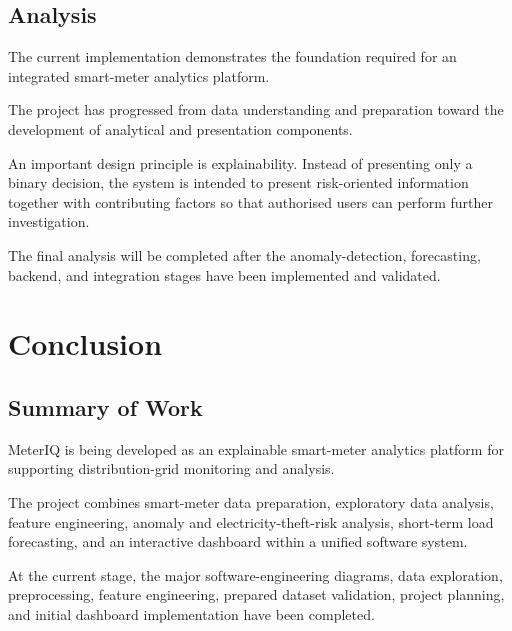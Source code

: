 \documentclass{tietreport}
\begin{document}
\section{Analysis}

The current implementation demonstrates the foundation required for an
integrated smart-meter analytics platform.

The project has progressed from data understanding and preparation toward
the development of analytical and presentation components.

An important design principle is explainability. Instead of presenting only
a binary decision, the system is intended to present risk-oriented
information together with contributing factors so that authorised users can
perform further investigation.

The final analysis will be completed after the anomaly-detection,
forecasting, backend, and integration stages have been implemented and
validated.


\chapter{Conclusion}

\section{Summary of Work}

MeterIQ is being developed as an explainable smart-meter analytics platform
for supporting distribution-grid monitoring and analysis.

The project combines smart-meter data preparation, exploratory data
analysis, feature engineering, anomaly and electricity-theft-risk analysis,
short-term load forecasting, and an interactive dashboard within a unified
software system.

At the current stage, the major software-engineering diagrams, data
exploration, preprocessing, feature engineering, prepared dataset
validation, project planning, and initial dashboard implementation have been
completed.
\end{document}
